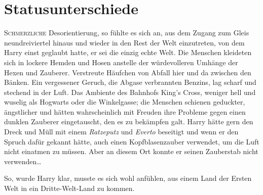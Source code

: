 \chapter{Statusunterschiede}

\lettrine{S}{chmerzliche} Desorientierung, so fühlte es sich an, aus dem Zugang zum Gleis neundreiviertel hinaus und wieder in den Rest der Welt einzutreten, von dem Harry einst geglaubt hatte, er sei die einzig echte Welt. Die Menschen kleideten sich in lockere Hemden und Hosen anstelle der würdevolleren Umhänge der Hexen und Zauberer. Verstreute Häufchen von Abfall hier und da zwischen den Bänken. Ein vergessener Geruch, die Abgase verbrannten Benzins, lag scharf und stechend in der Luft. Das Ambiente des Bahnhofs King’s Cross, weniger hell und wuselig als Hogwarts oder die Winkelgasse; die Menschen schienen geduckter, ängstlicher und hätten wahrscheinlich mit Freuden ihre Probleme gegen einen dunklen Zauberer eingetauscht, den es zu bekämpfen galt. Harry hätte gern den Dreck und Müll mit einem \emph{Ratzeputz} und \emph{Everto} beseitigt und wenn er den Spruch dafür gekannt hätte, auch einen Kopfblasenzauber verwendet, um die Luft nicht einatmen zu müssen. Aber an diesem Ort konnte er seinen Zauberstab nicht verwenden…

So, wurde Harry klar, musste es sich wohl anfühlen, aus einem Land der Ersten Welt in ein Dritte-Welt-Land zu kommen.

